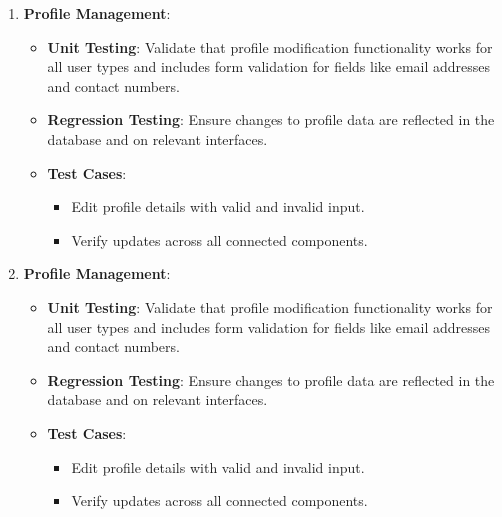     \begin{enumerate}
        \item \textbf{Profile Management}:
        \begin{itemize}
            \item \textbf{Unit Testing}: 
            Validate that profile modification functionality works for all user types and includes form validation for fields like email addresses and contact numbers.
            \item \textbf{Regression Testing}: 
            Ensure changes to profile data are reflected in the database and on relevant interfaces.
            \item \textbf{Test Cases}:
            \begin{itemize}
                \item Edit profile details with valid and invalid input.
                \item Verify updates across all connected components.
            \end{itemize}
        \end{itemize}
    
        \item \textbf{Profile Management}:
        \begin{itemize}
            \item \textbf{Unit Testing}: 
            Validate that profile modification functionality works for all user types and includes form validation for fields like email addresses and contact numbers.
            \item \textbf{Regression Testing}: 
            Ensure changes to profile data are reflected in the database and on relevant interfaces.
            \item \textbf{Test Cases}:
            \begin{itemize}
                \item Edit profile details with valid and invalid input.
                \item Verify updates across all connected components.
            \end{itemize}
        \end{itemize}
    

\end{enumerate}

